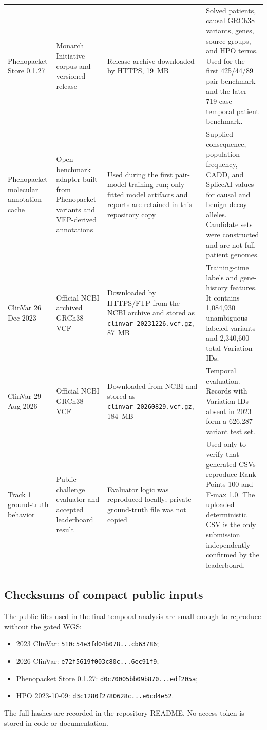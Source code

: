 \documentclass[11pt]{article}
\newcommand{\code}[1]{\texttt{#1}}
\begin{document}
\begin{longtable}{p{}p{}p{}p{}}
Phenopacket Store 0.1.27 & Monarch Initiative corpus and versioned release \citep{phenopacketstore2025,phenopacketrelease2026} & Release archive downloaded by HTTPS, 19~MB & Solved patients, causal GRCh38 variants, genes, source groups, and HPO terms. Used for the first 425/44/89 pair benchmark and the later 719-case temporal patient benchmark. \\
Phenopacket molecular annotation cache & Open benchmark adapter built from Phenopacket variants and VEP-derived annotations & Used during the first pair-model training run; only fitted model artifacts and reports are retained in this repository copy & Supplied consequence, population-frequency, CADD, and SpliceAI values for causal and benign decoy alleles. Candidate sets were constructed and are not full patient genomes. \\
ClinVar 26 Dec 2023 & Official NCBI archived GRCh38 VCF \citep{clinvar} & Downloaded by HTTPS/FTP from the NCBI archive and stored as \code{clinvar\_20231226.vcf.gz}, 87~MB & Training-time labels and gene-history features. It contains 1,084,930 unambiguous labeled variants and 2,340,600 total Variation IDs. \\
ClinVar 29 Aug 2026 & Official NCBI GRCh38 VCF \citep{clinvar} & Downloaded from NCBI and stored as \code{clinvar\_20260829.vcf.gz}, 184~MB & Temporal evaluation. Records with Variation IDs absent in 2023 form a 626,287-variant test set. \\
Track 1 ground-truth behavior & Public challenge evaluator and accepted leaderboard result \citep{hackathon2026} & Evaluator logic was reproduced locally; private ground-truth file was not copied & Used only to verify that generated CSVs reproduce Rank Points 100 and F-max 1.0. The uploaded deterministic CSV is the only submission independently confirmed by the leaderboard. \\
\bottomrule
\end{longtable}
\normalsize
\subsection{Checksums of compact public inputs}

The public files used in the final temporal analysis are small enough to reproduce without the gated WGS:
\begin{itemize}
\item 2023 ClinVar: \code{510c54e3fd04b078...cb63786};
\item 2026 ClinVar: \code{e72f5619f003c80c...6ec91f9};
\item Phenopacket Store 0.1.27: \code{d0c70005bb09b870...edf205a};
\item HPO 2023-10-09: \code{d3c1280f2780628c...e6cd4e52}.
\end{itemize}
The full hashes are recorded in the repository README. No access token is stored in code or documentation.
\end{document}
